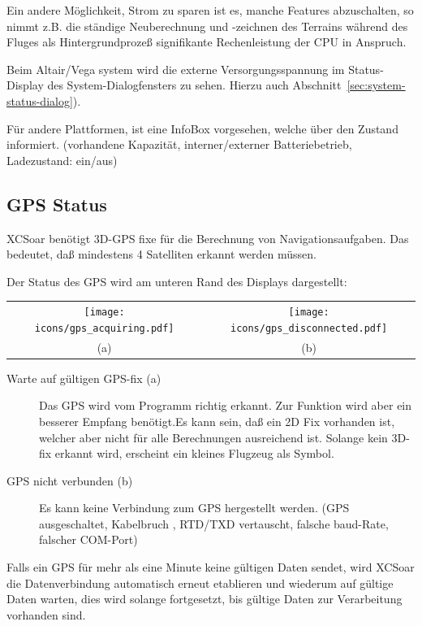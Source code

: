 Ein andere Möglichkeit, Strom zu sparen ist es, manche Features abzuschalten, so nimmt z.B. die ständige Neuberechnung und -zeichnen des Terrains während des Fluges als Hintergrundprozeß  signifikante Rechenleistung der CPU in Anspruch.

Beim \textsf{Altair}/Vega system wird die externe Versorgungsspannung im Status-Display des System-Dialogfensters zu sehen.
 Hierzu auch Abschnitt~\ref{sec:system-status-dialog}).

Für andere Plattformen, ist eine  InfoBox vorgesehen, welche über den Zustand informiert.
(vorhandene Kapazität, interner/externer Batteriebetrieb, Ladezustand: ein/aus)

\subsection*{GPS Status}

\textsf{XCSoar} benötigt 3D-GPS fixe für die Berechnung von Navigationsaufgaben.
Das bedeutet, daß mindestens 4 Satelliten erkannt werden müssen.

Der Status des GPS wird am unteren Rand des Displays dargestellt:

\begin{tabular}{c c}%
\texttt{[image: icons/gps\_acquiring.pdf]} & \texttt{[image: icons/gps\_disconnected.pdf]}\\
(a) & (b)
\end{tabular}

\begin{description}
\item[Warte auf gültigen GPS-fix (a)]  Das GPS wird vom Programm richtig erkannt. Zur Funktion wird aber ein besserer Empfang benötigt.Es kann sein, daß ein 2D Fix vorhanden ist, welcher aber nicht für alle Berechnungen ausreichend ist.
Solange kein 3D-fix erkannt wird, erscheint ein kleines Flugzeug als Symbol.

\item[GPS nicht verbunden (b)]  Es kann keine Verbindung zum GPS hergestellt werden.
 (GPS ausgeschaltet, Kabelbruch , RTD/TXD vertauscht, falsche baud-Rate, falscher COM-Port)
\end{description}

Falls ein GPS für mehr als eine Minute keine gültigen Daten sendet, wird \textsf{XCSoar} die Datenverbindung 
automatisch erneut etablieren und wiederum auf gültige Daten warten, dies wird solange fortgesetzt, 
bis gültige Daten zur Verarbeitung vorhanden sind. 


